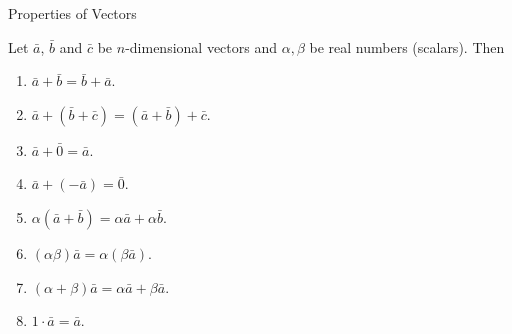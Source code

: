 \documentclass{beamer}
\begin{document}
    \begin{frame}[t]{Properties of Vectors}
        \par Let $\bar{a}$, $\bar{b}$ and $\bar{c}$ be $n$-dimensional vectors and $\alpha,\beta$ be real numbers (scalars). Then 
        \begin{enumerate}
            \item $\bar{a} + \bar{b} = \bar{b} + \bar{a}$.
            \item $\bar{a} + (\bar{b} + \bar{c}) = (\bar{a} + \bar{b}) + \bar{c}$.
            \item $\bar{a} + \bar{0} = \bar{a}$.
            \item $\bar{a} + (-\bar{a}) = \bar{0}$.
            \item $\alpha (\bar{a} + \bar{b}) = \alpha\bar{a} + \alpha\bar{b}$.
            \item $(\alpha \beta)\bar{a} = \alpha (\beta \bar{a})$.
            \item $(\alpha + \beta)\bar{a} = \alpha \bar{a} + \beta \bar{a}$.
            \item $1 \cdot \bar{a} = \bar{a}$.
        \end{enumerate}
    \end{frame} 
\end{document}
